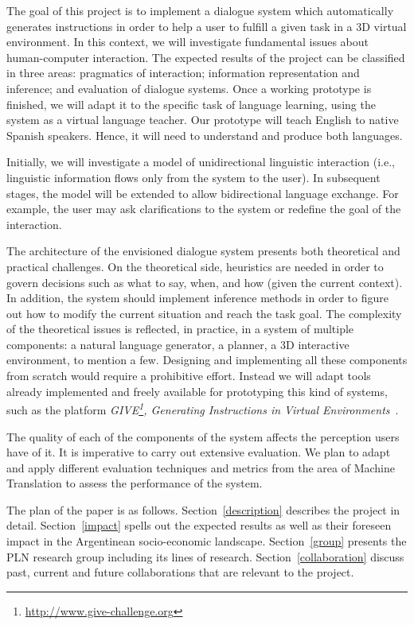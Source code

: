 
The goal of this project is to implement a dialogue system which automatically
generates instructions in order to help a user to fulfill a
given task in a 3D virtual environment. In this context, we will investigate
fundamental issues about human-computer interaction. The expected results of the
project can be classified in three areas: pragmatics
of interaction;  information representation and inference; and evaluation of
dialogue systems. Once a working prototype is finished, we will adapt it to
the specific task of language learning, using the system as a virtual language
teacher. Our prototype will teach English to native Spanish speakers. Hence, it
will need to understand and produce both languages.

Initially, we will investigate a model of unidirectional linguistic
interaction (i.e., linguistic information flows only from the system to the
user). In subsequent stages, the model will be
extended to allow bidirectional language exchange. For example, the user may
ask clarifications to the system or redefine the goal of the interaction.

The architecture of the envisioned dialogue system presents both theoretical and
practical challenges. On the theoretical side, heuristics are needed in order to
govern
decisions such as what to say, when, and how (given the current
context). In addition, the system should implement inference methods in order
to figure out how to modify the current situation and reach the task goal.
The complexity of
the theoretical issues is reflected, in practice, in a system of
multiple components: a natural language generator, a planner,
a 3D interactive environment, to mention a few. Designing
and implementing all these components from scratch would 
require a prohibitive effort. Instead we will adapt tools already implemented 
and freely available for prototyping this kind of 
systems, such as the platform
\emph{GIVE\footnote{\url{http://www.give-challenge.org}}, Generating
Instructions in Virtual
Environments}~\cite{byron09}. 

The quality of each of the components of the system affects the
perception users have of it. It is imperative to carry out 
extensive evaluation. 
We plan to adapt and apply different evaluation techniques and
metrics from the area of Machine Translation to assess the  
performance of the system.

The plan of the paper is as follows. Section~\ref{description} describes
the project in detail. 
Section~\ref{impact} spells out the expected results as
 well as their foreseen impact in the Argentinean socio-economic landscape. 
 Section~\ref{group} presents the PLN research group including its 
 lines of research. Section~\ref{collaboration} discuss past, current 
 and future collaborations that are relevant to the project.
 
